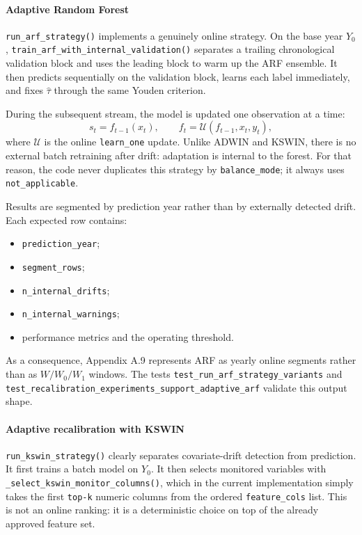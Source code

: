 \paragraph{Adaptive Random Forest}
\texttt{run\_arf\_strategy()} implements a genuinely online strategy. On the base year \(Y_0\), \texttt{train\_arf\_with\_internal\_validation()} separates a trailing chronological validation block and uses the leading block to warm up the ARF ensemble. It then predicts sequentially on the validation block, learns each label immediately, and fixes \(\hat{\tau}\) through the same Youden criterion.

During the subsequent stream, the model is updated one observation at a time:
\[
s_t = f_{t-1}(x_t),
\qquad
f_t = \mathcal{U}(f_{t-1}, x_t, y_t),
\]
where \(\mathcal{U}\) is the online \texttt{learn\_one} update. Unlike ADWIN and KSWIN, there is no external batch retraining after drift: adaptation is internal to the forest. For that reason, the code never duplicates this strategy by \texttt{balance\_mode}; it always uses \texttt{not\_applicable}.

Results are segmented by prediction year rather than by externally detected drift. Each expected row contains:
\begin{itemize}[leftmargin=*]
  \item \texttt{prediction\_year};
  \item \texttt{segment\_rows};
  \item \texttt{n\_internal\_drifts};
  \item \texttt{n\_internal\_warnings};
  \item performance metrics and the operating threshold.
\end{itemize}
As a consequence, Appendix A.9 represents ARF as yearly online segments rather than as \(W/W_0/W_1\) windows. The tests \texttt{test\_run\_arf\_strategy\_variants} and \texttt{test\_recalibration\_experiments\_support\_adaptive\_arf} validate this output shape.

\paragraph{Adaptive recalibration with KSWIN}
\texttt{run\_kswin\_strategy()} clearly separates covariate-drift detection from prediction. It first trains a batch model on \(Y_0\). It then selects monitored variables with \texttt{\_select\_kswin\_monitor\_columns()}, which in the current implementation simply takes the first \texttt{top-k} numeric columns from the ordered \texttt{feature\_cols} list. This is not an online ranking: it is a deterministic choice on top of the already approved feature set.

